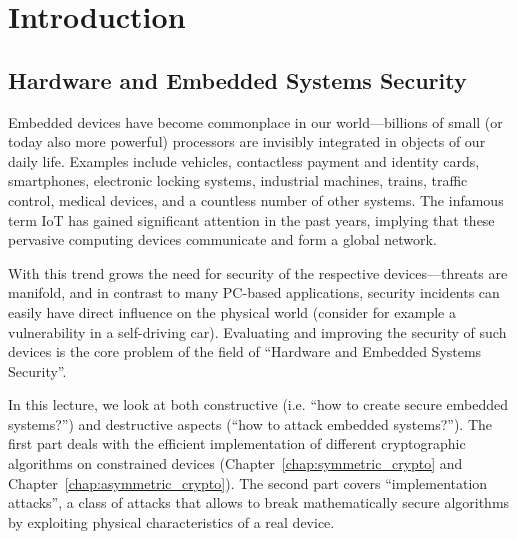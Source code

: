 

\chapter{Introduction}
\thispagestyle{fancy}

\label{chap:intro}

\section{Hardware and Embedded Systems Security}
\label{sec:intro:motivation}

Embedded devices have become commonplace in our world---billions of small (or today also more powerful) processors are invisibly integrated in objects of our daily life. Examples include vehicles, contactless payment and identity cards, smartphones, electronic locking systems, industrial machines, trains, traffic control, medical devices, and a countless number of other systems. The infamous term \ac{IoT} has gained significant attention in the past years, implying that these pervasive computing devices communicate and form a global network.

With this trend grows the need for security of the respective devices---threats are manifold, and in contrast to many \acs{PC}-based applications, security incidents can easily have direct influence on the physical world (consider for example a vulnerability in a self-driving car). Evaluating and improving the security of such devices is the core problem of the field of ``Hardware and Embedded Systems Security''. 

In this lecture, we look at both constructive (i.e. ``how to create secure embedded systems?'') and destructive aspects (``how to attack embedded systems?''). The first part deals with the efficient implementation of different cryptographic algorithms on constrained devices (Chapter~\ref{chap:symmetric_crypto} and Chapter~\ref{chap:asymmetric_crypto}). The second part covers ``implementation attacks'', a class of attacks that allows to break mathematically secure algorithms by exploiting physical characteristics of a real device.

